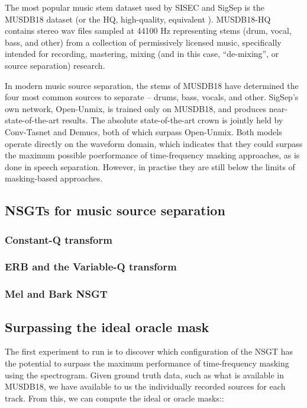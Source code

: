 \documentclass[letter,12pt,notitlepage]{article}
\begin{document}
The most popular music stem dataset used by SISEC and SigSep is the MUSDB18 dataset \cite{musdb18} (or the HQ, high-quality, equivalent \cite{musdb18-hq}). MUSDB18-HQ contains stereo wav files sampled at 44100 Hz representing stems (drum, vocal, bass, and other) from a collection of permissively licensed music, specifically intended for recording, mastering, mixing (and in this case, ``de-mixing'', or source separation) research.

In modern music source separation, the stems of MUSDB18 have determined the four most common sources to separate -- drums, bass, vocals, and other. SigSep's own network, Open-Unmix, is trained only on MUSDB18, and produces near-state-of-the-art results. The absolute state-of-the-art crown is jointly held by Conv-Tasnet and Demucs, both of which surpass Open-Unmix. Both models operate directly on the waveform domain, which indicates that they could surpass the maximum possible poerformance of time-frequency masking approaches, as is done in speech separation. However, in practise they are still below the limits of masking-based approaches.

\subsection{NSGTs for music source separation}

\subsubsection{Constant-Q transform}

\subsubsection{ERB and the Variable-Q transform}

\subsubsection{Mel and Bark NSGT}

\subsection{Surpassing the ideal oracle mask}

The first experiment to run is to discover which configuration of the NSGT has the potential to surpass the maximum performance of time-frequency masking using the spectrogram. Given ground truth data, such as what is available in MUSDB18, we have available to us the individually recorded sources for each track. From this, we can compute the ideal or oracle masks::
\end{document}
